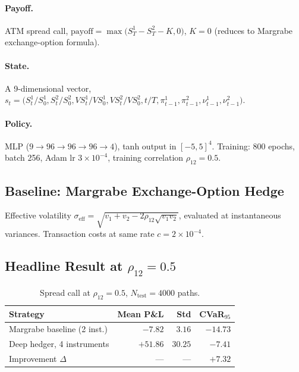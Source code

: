 \documentclass[11pt, a4paper]{article}
\begin{document}
\paragraph{Payoff.} ATM spread call,
$\text{payoff} = \max\bigl(S^1_T - S^2_T - K, 0\bigr)$, $K = 0$
(reduces to Margrabe exchange-option formula).

\paragraph{State.} A 9-dimensional vector,
$s_t = \bigl(S^1_t / S^1_0, S^2_t / S^2_0, VS^1_t / VS^1_0, VS^2_t / VS^2_0, t/T,
\pi^1_{t-1}, \pi^2_{t-1}, \nu^1_{t-1}, \nu^2_{t-1}\bigr)$.

\paragraph{Policy.} MLP ($9 \to 96 \to 96 \to 96 \to 4$), tanh output
in $[-5, 5]^4$. Training: 800 epochs, batch 256, Adam lr $3\times 10^{-4}$,
training correlation $\rho_{12} = 0.5$.

\subsection{Baseline: Margrabe Exchange-Option Hedge}

Effective volatility $\sigma_{\text{eff}} = \sqrt{v_1 + v_2 - 2\rho_{12}\sqrt{v_1 v_2}}$,
evaluated at instantaneous variances. Transaction costs at same rate $c = 2\times 10^{-4}$.

\subsection{Headline Result at $\rho_{12} = 0.5$}

\begin{table}[h!]
\centering
\small
\begin{tabular}{lrrr}
\toprule
Strategy & Mean P\&L & Std & CVaR$_{95}$ \\
\midrule
Margrabe baseline (2 inst.) & $-7.82$ & $3.16$ & $-14.73$ \\
Deep hedger, 4 instruments  & $+51.86$ & $30.25$ & $-7.41$ \\
\midrule
Improvement $\Delta$ & --- & --- & $+7.32$ \\
\bottomrule
\end{tabular}
\caption{Spread call at $\rho_{12} = 0.5$, $N_\text{test}=4000$ paths.}
\label{tab:w6-headline}
\end{table}
\end{document}

